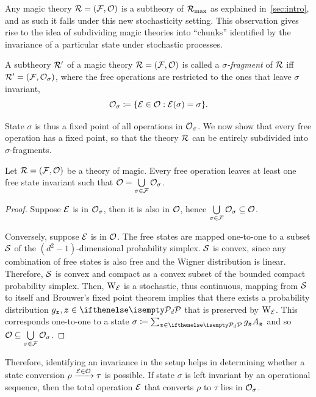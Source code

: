 \documentclass[pra,
aps,
twocolumn,
superscriptaddress,
groupedaddress,
nofootinbib,
reprint
]{revtex4-1}
\begin{document}
Any magic theory $\R = (\F, \O)$ is a subtheory of $\Rmax$ as explained in~\cref{sec:intro}, and as such it falls under this new stochasticity setting. 
This observation gives rise to the idea of subdividing magic theories into ``chunks'' identified by the invariance of a particular state under stochastic processes. 
\begin{definition}\label{def:sigmafrag}
    A subtheory $\R'$ of a magic theory $\R = (\F, \O)$ is called a \emph{$\sigma$-fragment} of $\R$ iff $\R' = (\F, \O_\sigma)$, where the free operations are restricted to the ones that leave $\sigma$ invariant,
    \begin{equation}
        \O_\sigma \coloneqq \{ \E \in \O: \E(\sigma) = \sigma \}.
    \end{equation}
\end{definition}

State $\sigma$ is thus a fixed point of all operations in $\O_\sigma$. 
We now show that every free operation has a fixed point, so that the theory $\R$ can be entirely subdivided into $\sigma$-fragments.

\begin{theorem}
    Let $\R = (\F, \O)$ be a theory of magic.
    Every free operation leaves at least one free state invariant such that $\O = \bigcup\limits_{\sigma \in \F} \O_\sigma$.
\end{theorem}
\begin{proof}
    Suppose $\E$ is in $\O_\sigma$, then it is also in $\O$, hence $\bigcup\limits_{\sigma \in \F} \O_\sigma \subseteq \O$.
    
    Conversely, suppose $\E$ is in $\O$. 
    The free states are mapped one-to-one to a subset $\cal{S}$ of the $(d^2 - 1)$-dimensional probability simplex.
    $\cal{S}$ is convex, since any combination of free states is also free and the Wigner distribution is linear.
    Therefore, $\cal{S}$ is convex and compact as a convex subset of the bounded compact probability simplex. 
    Then, $\W{\E}{}$ is a stochastic, thus continuous, mapping from $\cal{S}$ to itself and Brouwer's fixed point theorem  implies that there exists a probability distribution $g_{\bmz}, \bmz \in \pd$ that is preserved by $\W{\E}{}$.
    This corresponds one-to-one to a state $\sigma \coloneqq \sum_{\bmz \in \pd} g_{\bmz} A_{\bmz}$ and so $\O \subseteq \bigcup\limits_{\sigma \in \F} \O_\sigma$.
\end{proof}
Therefore, identifying an invariance in the setup helps in determining whether a state conversion $\rho \xrightarrow{\E \in \O} \tau$ is possible. 
If state $\sigma$ is left invariant by an operational sequence, then the total operation $\E$ that converts $\rho$ to $\tau$ lies in $\O_\sigma$. 
\end{document}

